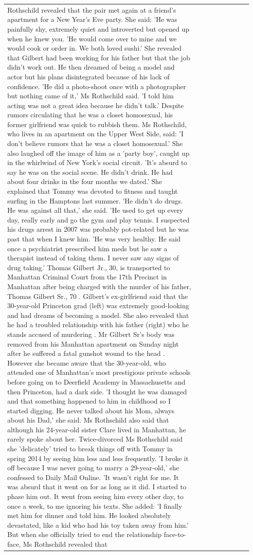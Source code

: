 \begin{table}[H]
\begin{tabular}{lllrlllll}
Rothschild revealed that the pair met again at a friend’s apartment for a New Year’s Eve party. She said: 'He was painfully shy, extremely quiet and introverted but opened up when he knew you. 'He would come over to mine and we would cook or order in. We both loved sushi.' She revealed that Gilbert had been working for his father but that the job didn't work out. He then dreamed of being a model and actor but his plans disintegrated because of his lack of confidence. 'He did a photo-shoot once with a photographer but nothing came of it,' Ms Rothschild said. 'I told him acting was not a great idea because he didn’t talk.' Despite rumors circulating that he was a closet homosexual, his former girlfriend was quick to rubbish them. Ms Rothschild, who lives in an apartment on the Upper West Side, said: 'I don’t believe rumors that he was a closet homosexual.' She also laughed off the image of him as a 'party boy', caught up in the whirlwind of New York's social circuit. 'It’s absurd to say he was on the social scene. He didn’t drink. He had about four drinks in the four months we dated.' She explained that Tommy was devoted to fitness and taught surfing in the Hamptons last summer. 'He didn’t do drugs. He was against all that,' she said. 'He used to get up every day, really early and go the gym and play tennis. I suspected his drugs arrest in 2007 was probably pot-related but he was past that when I knew him. 'He was very healthy. He said once a psychiatrist prescribed him meds but he saw a therapist instead of taking them. I never saw any signs of drug taking.' Thomas Gilbert Jr., 30, is transported to Manhattan Criminal Court from the 17th Precinct in Manhattan after being charged with the murder of his father, Thomas Gilbert Sr., 70 . Gilbert's ex-girlfriend said that the 30-year-old Princeton grad (left) was extremely good-looking and had dreams of becoming a model. She also revealed that he had a troubled relationship with his father (right) who he stands accused of murdering . Mr Gilbert Sr's body was removed from his Manhattan apartment on Sunday night after he suffered a fatal gunshot wound to the head . However she became aware that the 30-year-old, who attended one of Manhattan's most prestigious private schools before going on to Deerfield Academy in Massachusetts and then Princeton, had a dark side. 'I thought he was damaged and that something happened to him in childhood so I started digging. He never talked about his Mom, always about his Dad,' she said. Ms Rothschild also said that although his 24-year-old sister Clare lived in Manhattan, he rarely spoke about her. Twice-divorced Ms Rothschild said she 'delicately' tried to break things off with Tommy in spring 2014 by seeing him less and less frequently. 'I broke it off because I was never going to marry a 29-year-old,' she confessed to Daily Mail Online. 'It wasn’t right for me. It was absurd that it went on for as long as it did. I started to phase him out. It went from seeing him every other day, to once a week, to me ignoring his texts. She added: 'I finally met him for dinner and told him. He looked absolutely devastated, like a kid who had his toy taken away from him.' But when she officially tried to end the relationship face-to-face, Ms Rothschild revealed that 
\end{tabular}
\end{table}
